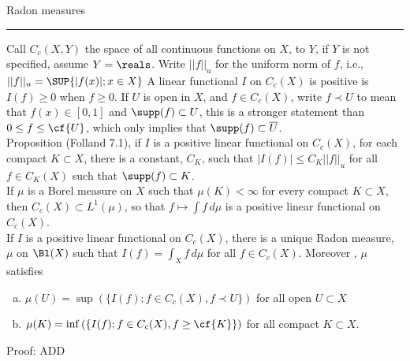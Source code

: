 
\break

\begin{flushleft}
Radon measures\\
\end{flushleft}

\hrule

\vspace{0.5in}


Call $C_c(X,Y)$ the space of all continuous functions on $X$, to $Y$, if $Y$ is not specified, assume $Y = \reals$. Write $||f||_u$ for the uniform norm of $f$, i.e., $||f||_u = \SUP{ |f(x)|; x \in X }$ A linear functional $I$ on $C_c(X)$ is positive is $I(f) \ge 0$ when $f \ge 0$. If $U$ is open in $X$, and $f \in C_c(X)$, write $f \prec U$ to mean that $f(x) \in [0,1]$ and $\supp(f) \subset U$, this is a stronger statement than $0 \le f \le \cf{U}$, which only implies that $\supp(f) \subset \overline{U}$. \\



Proposition (Folland 7.1), if $I$ is a positive linear functional on $C_c(X)$, for each compact $K \subset X$, there is a constant, $C_K$, such that $|I(f)| \le C_K ||f||_u$ for all $f \in C_K(X)$ such that $\supp(f) \subset K$. \\

If $\mu$ is a Borel measure on $X$ such that $\mu(K) < \infty$ for every compact $K \subset X$, then $C_c(X) \subset L^1(\mu)$, so that $ f \mapsto \int f \, d\mu$ is a positive linear functional on $C_c(X)$. \\



If $I$ is a positive linear functional on $C_c(X)$, there is a unique Radon measure, $\mu$ on $\Bl(X)$ such that $I(f) = \int_X f \, d\mu$ for all $f \in C_c(X)$. Moreover , $\mu$ satisfies

\begin{enumerate}[a)]
\item
$\mu(U) = \sup \left( \{ I(f); f\in C_c(X), f \prec U  \} \right) $ for all open $U \subset X$
\item
$\mu(K) = \inf \left( \{ I(f); f \in C_c(X), f \ge \cf{K} \}\right) $ for all compact $K \subset X$.
\end{enumerate}

\noindent
Proof: ADD






















